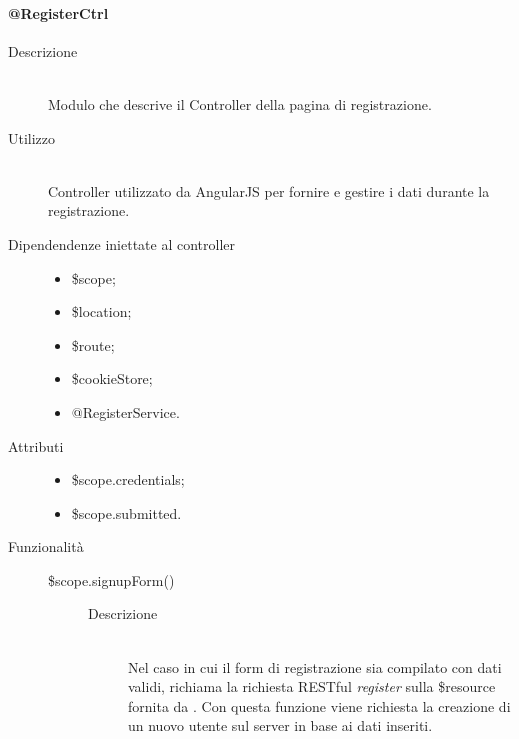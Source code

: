 \paragraph{@RegisterCtrl}
\begin{description}
 \item[Descrizione] \hfill \\
 Modulo che descrive il Controller della pagina di registrazione.
 
 \item[Utilizzo] \hfill \\
 Controller utilizzato da AngularJS per fornire e gestire i dati durante la registrazione.
 
 \item[Dipendendenze iniettate al controller] \hfill
 \begin{itemize}
  \item \$scope;
  \item \$location;
  \item \$route;
  \item \$cookieStore;
  \item @RegisterService.
 \end{itemize}
 
 \item[Attributi] \hfill
 \begin{itemize}
 \item \$scope.credentials;
 \item \$scope.submitted.
 \end{itemize}
 
 \item[Funzionalità] \hfill
 \begin{description}
  \item[\$scope.signupForm()] \hfill
  \begin{description}
   	\item[Descrizione] \hfill \\
  Nel caso in cui il form di registrazione sia compilato con dati validi, richiama la richiesta RESTful \textit{register} sulla \$resource 
  fornita da .
  Con questa funzione viene richiesta la creazione di un nuovo utente sul server in base ai dati inseriti.
   \end{description}
 \end{description}
\end{description}


